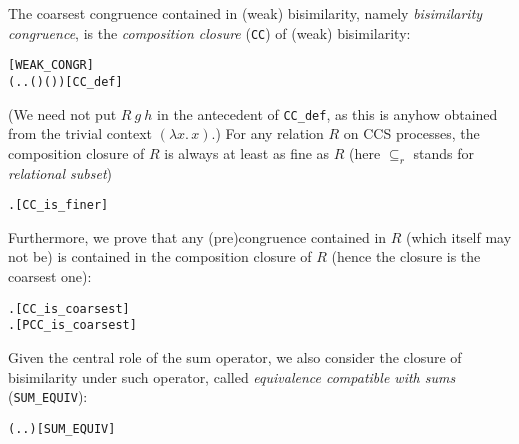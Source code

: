 The coarsest congruence
contained in (weak) bisimilarity, namely \emph{bisimilarity
  congruence}, is
the \emph{composition closure} (\texttt{CC}) of (weak) bisimilarity:
\begin{alltt}
 \HOLSymConst{\HOLTokenDefEquality{}}  \hfill{[WEAK_CONGR]}
  \HOLSymConst{\HOLTokenDefEquality{}} (\HOLTokenLambda{} . \HOLSymConst{\HOLTokenForall{}}.   \HOLSymConst{\HOLTokenImp{}}  ( ) ( ))\hfill{[CC_def]}
\end{alltt}
 (We need not  put $R\ g\ h$ in the antecedent of
  \texttt{CC\_def}, as this is anyhow obtained from the trivial context $(\lambda x.\,x)$.)
For any relation $R$ 
on CCS processes, the composition closure of $R$ is always at least as
fine as $R$
(here $\subseteq_r$ stands for \emph{relational subset})
\begin{alltt}
\HOLTokenTurnstile{} \HOLSymConst{\HOLTokenForall{}}.   \HOLSymConst{\HOLTokenRSubset{}} \hfill{[CC_is_finer]}
\end{alltt}
Furthermore, we prove that any (pre)congruence contained in $R$ (which
itself may not be) is contained in the composition closure of $R$
(hence the closure is the coarsest one):
\begin{alltt}
\HOLTokenTurnstile{} \HOLSymConst{\HOLTokenForall{}} .   \HOLSymConst{\HOLTokenConj{}}  \HOLSymConst{\HOLTokenRSubset{}}  \HOLSymConst{\HOLTokenImp{}}  \HOLSymConst{\HOLTokenRSubset{}}  \hfill{[CC_is_coarsest]}
\HOLTokenTurnstile{} \HOLSymConst{\HOLTokenForall{}} .   \HOLSymConst{\HOLTokenConj{}}  \HOLSymConst{\HOLTokenRSubset{}}  \HOLSymConst{\HOLTokenImp{}}  \HOLSymConst{\HOLTokenRSubset{}}  \hfill{[PCC_is_coarsest]}
\end{alltt}

Given the central role of the  
 sum operator, we also consider the closure of bisimilarity under such
 operator, called \emph{equivalence compatible with sums}
(\texttt{SUM_EQUIV}): %
\begin{alltt}
 \HOLSymConst{\HOLTokenDefEquality{}} (\HOLTokenLambda{} . \HOLSymConst{\HOLTokenForall{}}.  \HOLSymConst{\ensuremath{+}}  \HOLSymConst{\HOLTokenWeakEQ}  \HOLSymConst{\ensuremath{+}} )\hfill{[SUM_EQUIV]}
\end{alltt}


